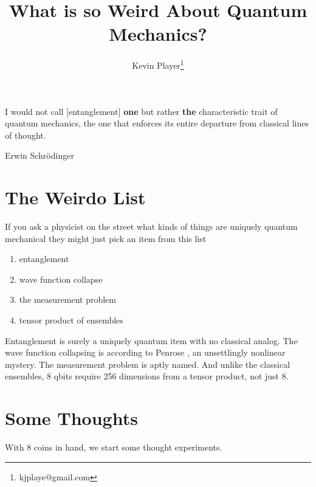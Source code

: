 \documentclass[12pt,a4paper]{article}
\begin{document}
\title{What is so Weird About Quantum Mechanics?}
\author[1]{Kevin Player\footnote{kjplaye@gmail.com}}

\maketitle


\epigraph{I would not call [entanglement] {\bf one} but rather {\bf the} characteristic trait of quantum mechanics, the one that enforces its entire departure from classical lines of thought.}{Erwin Schrödinger}


\section{The Weirdo List}
If you ask a physicist on the street what kinds of things are uniquely quantum mechanical they might just pick an item from this list

\begin{enumerate}
\item entanglement
\item wave function collapse
\item the measurement problem
\item tensor product of ensembles
\end{enumerate}

Entanglement is surely a uniquely quantum item with no classical analog.  The wave function collapsing is according to Penrose \cite{penrose}, an unsettlingly nonlinear mystery.  The measurement problem is aptly named.  And unlike the classical ensembles, 8 qbits require 256 dimensions from a tensor product, not just 8.

\section{Some Thoughts}
With 8 coins in hand, we start some thought experiments.
\end{document}
